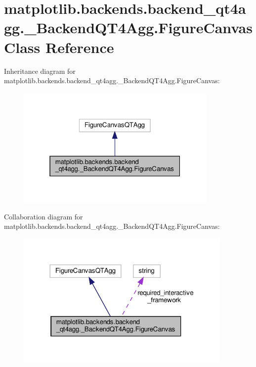 \hypertarget{classmatplotlib_1_1backends_1_1backend__qt4agg_1_1__BackendQT4Agg_1_1FigureCanvas}{}\section{matplotlib.\+backends.\+backend\+\_\+qt4agg.\+\_\+\+Backend\+Q\+T4\+Agg.\+Figure\+Canvas Class Reference}
\label{classmatplotlib_1_1backends_1_1backend__qt4agg_1_1__BackendQT4Agg_1_1FigureCanvas}


Inheritance diagram for matplotlib.\+backends.\+backend\+\_\+qt4agg.\+\_\+\+Backend\+Q\+T4\+Agg.\+Figure\+Canvas\+:
\nopagebreak
\begin{figure}[H]
\begin{center}
\leavevmode
\includegraphics[width=277pt]{classmatplotlib_1_1backends_1_1backend__qt4agg_1_1__BackendQT4Agg_1_1FigureCanvas__inherit__graph}
\end{center}
\end{figure}


Collaboration diagram for matplotlib.\+backends.\+backend\+\_\+qt4agg.\+\_\+\+Backend\+Q\+T4\+Agg.\+Figure\+Canvas\+:
\nopagebreak
\begin{figure}[H]
\begin{center}
\leavevmode
\includegraphics[width=298pt]{classmatplotlib_1_1backends_1_1backend__qt4agg_1_1__BackendQT4Agg_1_1FigureCanvas__coll__graph}
\end{center}
\end{figure}
